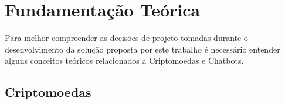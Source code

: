 \chapter{Fundamentação Teórica} \label{cha:fundamentacao}

Para melhor compreender as decisões de projeto tomadas durante o desenvolvimento da solução proposta por este trabalho é necessário entender alguns conceitos teóricos relacionados a Criptomoedas e Chatbots.

\section{Criptomoedas} \label{sec:fundamentacao:criptomoedas}



